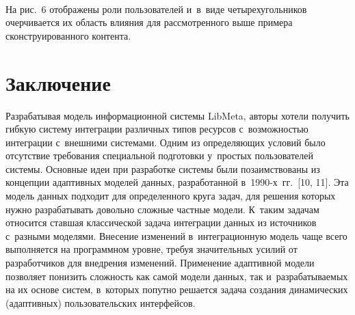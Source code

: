 \begin{multicols}{2}
\begin{figure*} %
 \vspace*{1pt}
\begin{center}
\mbox{%
\epsfxsize=163.09mm
}
\end{center}
\vspace*{-9pt}
\vspace*{6pt}
\end{figure*}

    На рис.~6 отображены роли пользователей и~в~виде четырехугольников 
очерчивается их область влияния для рассмотренного выше примера 
сконструированного контента.
    
\section{Заключение}

    Разрабатывая модель информационной системы LibMeta, авторы хотели 
получить гибкую сис\-тему интеграции различных типов ресурсов 
с~возможностью интеграции с~внешними системами. Одним из 
определяющих условий было отсутствие тре\-бования специальной 
подготовки у~простых пользователей системы. Основные идеи при 
разработке системы были позаимствованы из концепции адап\-тив\-ных 
моделей данных, разработанной в~\mbox{1990-х}~гг.~[10, 11]. Эта модель данных 
подходит для определенного круга задач, для решения которых нужно 
разрабатывать довольно сложные частные модели. К~таким задачам 
относится ставшая классической задача интеграции данных из источников 
с~разными моделями. Внесение изменений в~интеграционную модель чаще 
всего выполняется на программном уровне, требуя значительных 
усилий от разработчиков для внедрения изменений. Применение адаптивной 
модели позволяет понизить сложность как самой модели данных, так 
и~разрабатываемых на их основе систем, в~которых попутно решается задача 
создания динамических (адаптивных) пользовательских интерфейсов. 
    

\end{multicols}
